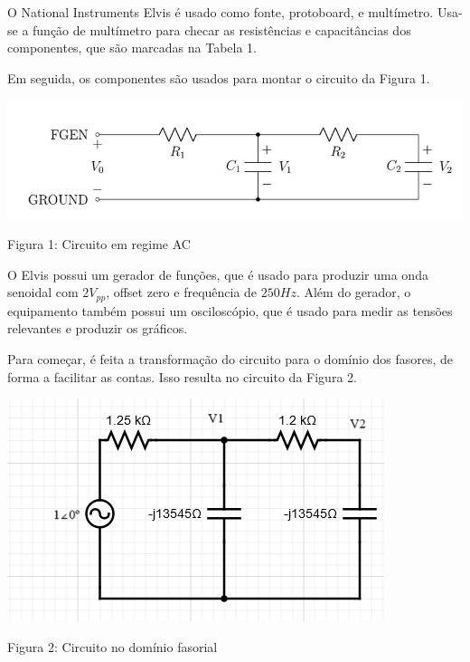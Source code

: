 \documentclass[a4 paper]{article}
\newcommand{\parag}{\hspace{30pt}}
\begin{document}
\parag O National Instruments Elvis é usado como fonte, protoboard, e multímetro. Usa-se a função de multímetro para checar as resistências e capacitâncias dos componentes, que são marcadas na Tabela 1.



Em seguida, os componentes são usados para montar o circuito da Figura 1.

\begin{table}[h]
\centering
\includegraphics[scale=0.7]{figuras/figura1}
\end{table}

\begin{center}
Figura 1: Circuito em regime AC
\end{center}

O Elvis possui um gerador de funções, que é usado para produzir uma onda senoidal com $2V_{pp}$, offset zero e frequência de $250Hz$. Além do gerador, o equipamento também possui um osciloscópio, que é usado para medir as tensões relevantes e produzir os gráficos.

Para começar, é feita a transformação do circuito para o domínio dos fasores, de forma a facilitar as contas. Isso resulta no circuito da Figura 2.

\begin{table}[h]
\centering
\includegraphics[scale=0.7]{figuras/figura2}
\end{table}

\begin{center}
Figura 2: Circuito no domínio fasorial
\end{center}
\end{document}
